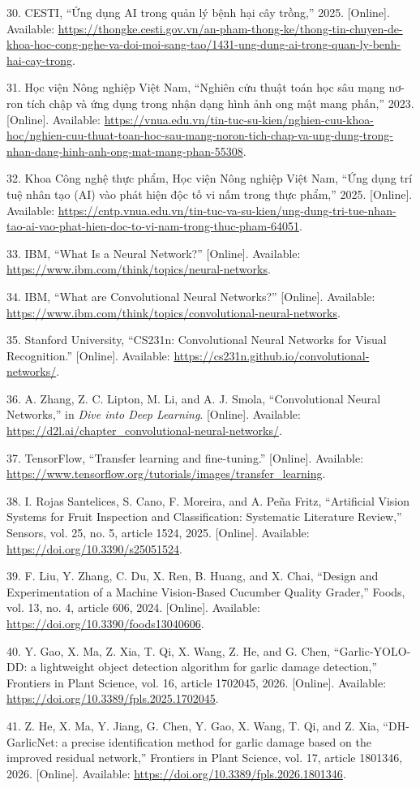\documentclass[
]{article}
\begin{document}
30. CESTI, ``Ứng dụng AI trong quản lý bệnh hại cây trồng,'' 2025.
{[}Online{]}. Available:
\url{https://thongke.cesti.gov.vn/an-pham-thong-ke/thong-tin-chuyen-de-khoa-hoc-cong-nghe-va-doi-moi-sang-tao/1431-ung-dung-ai-trong-quan-ly-benh-hai-cay-trong}.

31. Học viện Nông nghiệp Việt Nam, ``Nghiên cứu thuật toán học sâu mạng
nơ-ron tích chập và ứng dụng trong nhận dạng hình ảnh ong mật mang
phấn,'' 2023. {[}Online{]}. Available:
\url{https://vnua.edu.vn/tin-tuc-su-kien/nghien-cuu-khoa-hoc/nghien-cuu-thuat-toan-hoc-sau-mang-noron-tich-chap-va-ung-dung-trong-nhan-dang-hinh-anh-ong-mat-mang-phan-55308}.

32. Khoa Công nghệ thực phẩm, Học viện Nông nghiệp Việt Nam, ``Ứng dụng
trí tuệ nhân tạo (AI) vào phát hiện độc tố vi nấm trong thực phẩm,''
2025. {[}Online{]}. Available:
\url{https://cntp.vnua.edu.vn/tin-tuc-va-su-kien/ung-dung-tri-tue-nhan-tao-ai-vao-phat-hien-doc-to-vi-nam-trong-thuc-pham-64051}.

33. IBM, ``What Is a Neural Network?'' {[}Online{]}. Available:
\url{https://www.ibm.com/think/topics/neural-networks}.

34. IBM, ``What are Convolutional Neural Networks?'' {[}Online{]}.
Available: \url{https://www.ibm.com/think/topics/convolutional-neural-networks}.

35. Stanford University, ``CS231n: Convolutional Neural Networks for
Visual Recognition.'' {[}Online{]}. Available:
\url{https://cs231n.github.io/convolutional-networks/}.

36. A. Zhang, Z. C. Lipton, M. Li, and A. J. Smola, ``Convolutional
Neural Networks,'' in \emph{Dive into Deep Learning}. {[}Online{]}.
Available: \url{https://d2l.ai/chapter_convolutional-neural-networks/}.

37. TensorFlow, ``Transfer learning and fine-tuning.'' {[}Online{]}.
Available: \url{https://www.tensorflow.org/tutorials/images/transfer_learning}.

38. I. Rojas Santelices, S. Cano, F. Moreira, and A. Peña Fritz,
``Artificial Vision Systems for Fruit Inspection and Classification:
Systematic Literature Review,'' Sensors, vol. 25, no. 5, article 1524,
2025. {[}Online{]}. Available: \url{https://doi.org/10.3390/s25051524}.

39. F. Liu, Y. Zhang, C. Du, X. Ren, B. Huang, and X. Chai, ``Design and
Experimentation of a Machine Vision-Based Cucumber Quality Grader,''
Foods, vol. 13, no. 4, article 606, 2024. {[}Online{]}. Available:
\url{https://doi.org/10.3390/foods13040606}.

40. Y. Gao, X. Ma, Z. Xia, T. Qi, X. Wang, Z. He, and G. Chen,
``Garlic-YOLO-DD: a lightweight object detection algorithm for garlic
damage detection,'' Frontiers in Plant Science, vol. 16, article 1702045,
2026. {[}Online{]}. Available:
\url{https://doi.org/10.3389/fpls.2025.1702045}.

41. Z. He, X. Ma, Y. Jiang, G. Chen, Y. Gao, X. Wang, T. Qi, and Z. Xia,
``DH-GarlicNet: a precise identification method for garlic damage based
on the improved residual network,'' Frontiers in Plant Science, vol. 17,
article 1801346, 2026. {[}Online{]}. Available:
\url{https://doi.org/10.3389/fpls.2026.1801346}.
\end{document}
